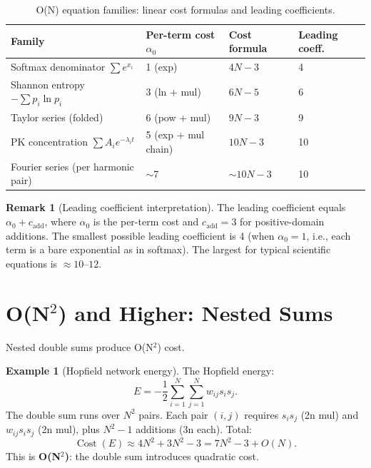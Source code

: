 \documentclass[12pt,a4paper]{article}
\theoremstyle{definition}
\newtheorem{remark}[theorem]{Remark}
\newtheorem{example}[theorem]{Example}
\newcommand{\Cost}{\operatorname{Cost}}
\begin{document}
\begin{table}[h]
\centering
\caption{O(N) equation families: linear cost formulas and leading coefficients.}
\label{tab:ON}
\smallskip
\begin{tabular}{@{}llll@{}}
\toprule
\textbf{Family} & \textbf{Per-term cost $\alpha_0$} & \textbf{Cost formula} & \textbf{Leading coeff.} \\
\midrule
Softmax denominator $\sum e^{x_i}$     & 1 (exp)         & $4N - 3$  & 4 \\
Shannon entropy $-\sum p_i \ln p_i$    & 3 (ln + mul)    & $6N - 5$  & 6 \\
Taylor series (folded)                 & 6 (pow + mul)   & $9N - 3$  & 9 \\
PK concentration $\sum A_i e^{-\lambda_i t}$ & 5 (exp + mul chain) & $10N - 3$ & 10 \\
Fourier series (per harmonic pair)     & $\sim$7         & $\sim 10N - 3$ & 10 \\
\bottomrule
\end{tabular}
\end{table}

\begin{remark}[Leading coefficient interpretation]
The leading coefficient equals $\alpha_0 + c_{\mathrm{add}}$, where
$\alpha_0$ is the per-term cost and $c_{\mathrm{add}} = 3$ for
positive-domain additions.  The smallest possible leading coefficient
is 4 (when $\alpha_0 = 1$, i.e., each term is a bare exponential as
in softmax).  The largest for typical scientific equations is
$\approx 10$--$12$.
\end{remark}

\section{O(N\texorpdfstring{$^2$}{²}) and Higher: Nested Sums}
\label{sec:ON2}

Nested double sums produce O(N$^2$) cost.

\begin{example}[Hopfield network energy]
\label{ex:hopfield}
The Hopfield energy:
\[
  E = -\frac{1}{2}\sum_{i=1}^{N}\sum_{j=1}^{N} w_{ij} s_i s_j.
\]
The double sum runs over $N^2$ pairs.  Each pair $(i,j)$ requires
$s_i s_j$ (2n mul) and $w_{ij} s_i s_j$ (2n mul), plus $N^2 - 1$
additions (3n each).  Total:
\[
  \Cost(E) \approx 4N^2 + 3N^2 - 3 = 7N^2 - 3 + O(N).
\]
This is \textbf{O(N$^2$)}: the double sum introduces quadratic cost.
\end{example}
\end{document}
